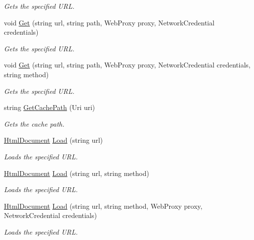 \begin{DoxyCompactItemize}
\begin{DoxyCompactList}\small\item\em Gets the specified U\+RL. \end{DoxyCompactList}\item 
void \hyperlink{class_html_agility_pack_1_1_html_web_a51b3f56c7cb520216e3a66a13898d05a}{Get} (string url, string path, Web\+Proxy proxy, Network\+Credential credentials)
\begin{DoxyCompactList}\small\item\em Gets the specified U\+RL. \end{DoxyCompactList}\item 
void \hyperlink{class_html_agility_pack_1_1_html_web_aed2024c76f4fcf832333e082e30558bc}{Get} (string url, string path, Web\+Proxy proxy, Network\+Credential credentials, string method)
\begin{DoxyCompactList}\small\item\em Gets the specified U\+RL. \end{DoxyCompactList}\item 
string \hyperlink{class_html_agility_pack_1_1_html_web_af4bb02fc4e61f9fb184bb3adf951ba29}{Get\+Cache\+Path} (Uri uri)
\begin{DoxyCompactList}\small\item\em Gets the cache path. \end{DoxyCompactList}\item 
\hyperlink{class_html_agility_pack_1_1_html_document}{Html\+Document} \hyperlink{class_html_agility_pack_1_1_html_web_a5a6f931d515b78d0ad88c00602e66a93}{Load} (string url)
\begin{DoxyCompactList}\small\item\em Loads the specified U\+RL. \end{DoxyCompactList}\item 
\hyperlink{class_html_agility_pack_1_1_html_document}{Html\+Document} \hyperlink{class_html_agility_pack_1_1_html_web_a63115a52cc0785e2170f1ae1fca32105}{Load} (string url, string method)
\begin{DoxyCompactList}\small\item\em Loads the specified U\+RL. \end{DoxyCompactList}\item 
\hyperlink{class_html_agility_pack_1_1_html_document}{Html\+Document} \hyperlink{class_html_agility_pack_1_1_html_web_ad341a6bd5fca16be62af30a028228404}{Load} (string url, string method, Web\+Proxy proxy, Network\+Credential credentials)
\begin{DoxyCompactList}\small\item\em Loads the specified U\+RL. \end{DoxyCompactList}\item 

\end{DoxyCompactItemize}
